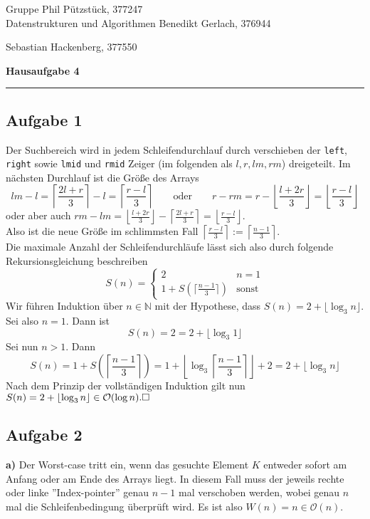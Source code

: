 \documentclass[a4paper,graphics,11pt]{article}
\newcommand{\aufgabe}[1]{\subsection*{Aufgabe #1}}
\begin{document}
\noindent Gruppe              \hfill Phil Pützstück, 377247\\
\noindent Datenstrukturen und Algorithmen \hfill Benedikt Gerlach, 376944\\
\strut\hfill Sebastian Hackenberg, 377550\\
\begin{center}
	\LARGE{\textbf{Hausaufgabe 4}}
\end{center}
\begin{center}
\rule[0.1ex]{\textwidth}{1pt}
\end{center}

\aufgabe{1}
Der Suchbereich wird in jedem Schleifendurchlauf durch verschieben der \texttt{left}, \texttt{right} sowie
\texttt{lmid} und \texttt{rmid} Zeiger (im folgenden als $l, r, lm, rm$) dreigeteilt. Im nächsten Durchlauf ist die Größe des Arrays
$$
    lm - l = \left\lceil \frac{2l + r}{3} \right\rceil - l
    = \left\lceil \frac{r - l}{3} \right\rceil
    \qquad \text{oder}\qquad
    r - rm = r - \left\lfloor \frac{l + 2r}{3} \right\rfloor
    = \left\lfloor \frac{r - l}{3} \right\rfloor
$$
oder aber auch
$rm - lm = \left\lfloor \frac{l + 2r}{3} \right\rfloor - \left\lceil \frac{2l + r}{3} \right\rceil
= \left\lfloor\frac{r - l}{3} \right\rfloor$.\\
Also ist die neue Größe im schlimmsten Fall
$\left\lceil \frac{r - l}{3} \right\rceil := \left\lceil\frac{n-1}{3}\right\rceil$.\\
Die maximale Anzahl der Schleifendurchläufe lässt sich also durch folgende Rekursionsgleichung beschreiben
$$
    S(n) = \begin{cases}
        2 & n = 1\\
        1 + S(\lceil\frac{n-1}{3}\rceil) & \text{sonst}
    \end{cases}
$$
Wir führen Induktion über $n \in \mathbb{N}$ mit der Hypothese, dass $S(n) = 2 + \lfloor\log_3 n\rfloor$.\\
Sei also $n = 1$. Dann ist
$$
    S(n) = 2 = 2 + \lfloor \log_3 1\rfloor
$$
Sei nun $n > 1$. Dann
$$
    S(n)
    = 1 + S\left(\left\lceil\frac{n-1}{3}\right\rceil\right)
    = 1 + \left\lfloor\log_3\left\lceil\frac{n-1}{3}\right\rceil\right\rfloor + 2
    = 2 + \lfloor \log_3 n\rfloor
$$
Nach dem Prinzip der vollständigen Induktion gilt nun $S(n) = 2 + \lfloor\log_3 n\rfloor \in \mathcal{O}(\log n).\hfill\square$
\aufgabe{2}
\textbf{a)}
Der Worst-case tritt ein, wenn das gesuchte Element $K$ entweder sofort am Anfang oder am Ende des
Arrays liegt. In diesem Fall muss der jeweils rechte oder linke ''Index-pointer'' genau $n-1$
mal verschoben werden, wobei genau $n$ mal die Schleifenbedingung überprüft wird.
Es ist also $W(n) = n\in \mathcal{O}(n)$.
\end{document}
